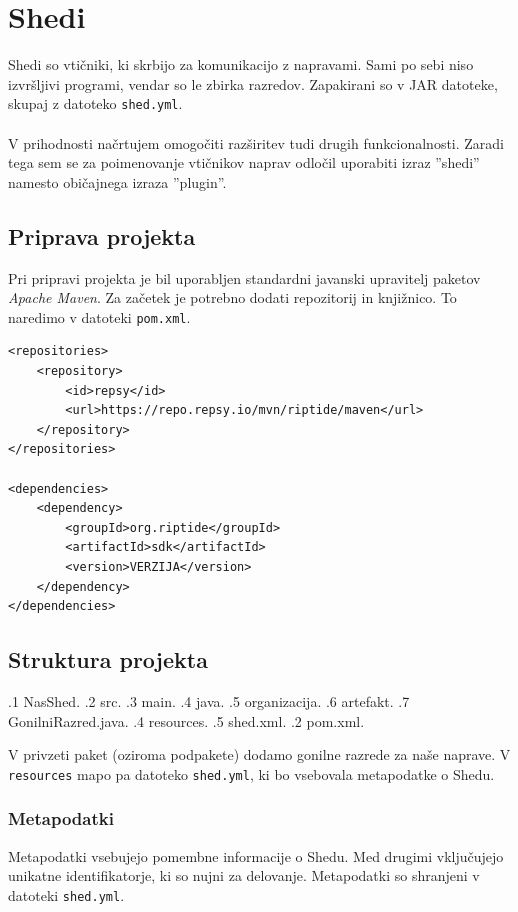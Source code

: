\documentclass[12pt]{article}
\begin{document}
\section{Shedi}
Shedi so vtičniki, ki skrbijo za komunikacijo z napravami. Sami po sebi
niso izvršljivi programi, vendar so le zbirka razredov. Zapakirani so v
JAR datoteke, skupaj z datoteko \texttt{shed.yml}.
\\\\
V prihodnosti načrtujem omogočiti razširitev tudi drugih funkcionalnosti.
Zaradi tega sem se za poimenovanje vtičnikov naprav odločil uporabiti
izraz ''shedi'' namesto običajnega izraza ''plugin''.

\subsection{Priprava projekta}
Pri pripravi projekta je bil uporabljen standardni javanski upravitelj
paketov \textit{Apache Maven}. Za začetek je potrebno dodati repozitorij in
knjižnico. To naredimo v datoteki \texttt{pom.xml}.

\begin{lstlisting}[style=XmlStyle]
<repositories>
	<repository>
		<id>repsy</id>
		<url>https://repo.repsy.io/mvn/riptide/maven</url>
	</repository>
</repositories>

<dependencies>
	<dependency>
		<groupId>org.riptide</groupId>
		<artifactId>sdk</artifactId>
		<version>VERZIJA</version>
	</dependency>
</dependencies>
\end{lstlisting}
\newpage

\subsection{Struktura projekta} \label{struktura-projekta}
\begin{dirtree}{%
.1 NasShed.
	.2 src.
		.3 main.
			.4 java.
				.5 organizacija.
					.6 artefakt.
						.7 GonilniRazred.java.
			.4 resources.
				.5 shed.xml.
	.2 pom.xml.
}
\end{dirtree}
\vspace*{12pt}
V privzeti paket (oziroma podpakete) dodamo gonilne razrede za naše naprave.
V \texttt{resources} mapo pa datoteko \texttt{shed.yml}, ki bo vsebovala
metapodatke o Shedu.

\subsubsection{Metapodatki}
Metapodatki vsebujejo pomembne informacije o Shedu. Med drugimi vključujejo
unikatne identifikatorje, ki so nujni za delovanje. Metapodatki so
shranjeni v datoteki \texttt{shed.yml}.
\end{document}
